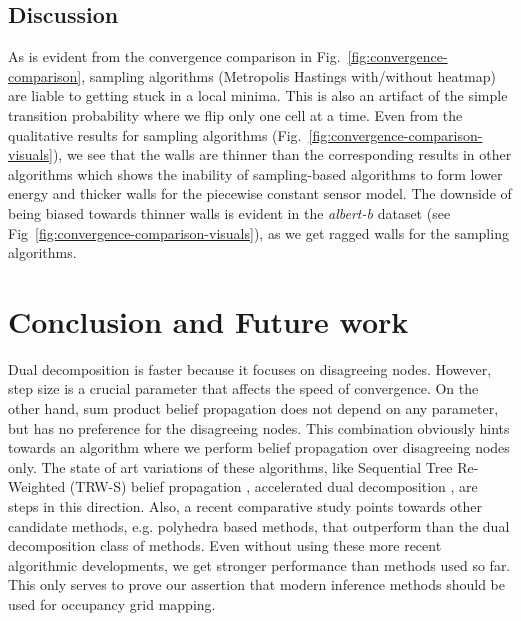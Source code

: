 \documentclass[letterpaper, 10 pt, conference]{ieeeconf} %
\begin{document}
\subsection{Discussion}
As is evident from the convergence comparison in
Fig.~\ref{fig:convergence-comparison}, sampling algorithms (Metropolis
Hastings with/without heatmap) are liable to getting stuck in a local minima.
This is also an artifact of the simple transition probability where we flip
only one cell at a time. Even from the qualitative results for sampling
algorithms (Fig.~\ref{fig:convergence-comparison-visuals}),
we see that the walls are thinner than the corresponding results in
other algorithms which shows the inability of sampling-based algorithms to
form lower energy and thicker walls for the piecewise constant sensor model. The
downside of being biased towards thinner walls is evident in the
\emph{albert-b} dataset (see
Fig~\ref{fig:convergence-comparison-visuals}), as we get ragged
walls for the sampling algorithms.

\section{Conclusion and Future work}
Dual decomposition is faster because it focuses on disagreeing
nodes. However, step size is a crucial parameter that affects the speed of
convergence. On the other hand, sum product belief propagation does not depend
on any parameter, but has no preference for the disagreeing nodes.
This combination obviously hints towards an algorithm where we perform 
belief propagation over disagreeing nodes only. The state of art variations 
of these algorithms, like Sequential Tree Re-Weighted (TRW-S) belief
propagation \cite{kolmogorov2006convergent}, accelerated dual decomposition
\cite{jojic2010accelerated}, are steps in this direction. Also, a recent
comparative study \cite{kappes2013comparative} points towards other candidate
methods, e.g. polyhedra based methods, that outperform than the dual
decomposition class of methods.  Even without using these more recent 
algorithmic developments, we get stronger performance than methods used so far. This
only serves to prove our assertion that modern inference methods should be
used for occupancy grid mapping.
\end{document}
